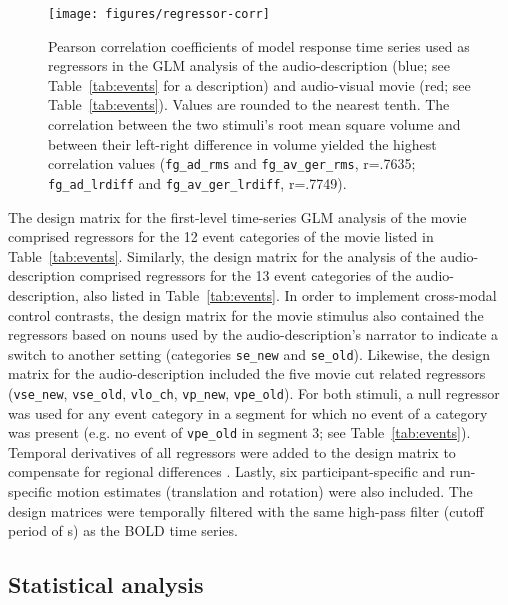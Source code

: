 \documentclass[english,11pt]{article}
\begin{document}
\begin{figure*}[tbp]
\centering
    \texttt{[image: figures/regressor-corr]} \caption{Pearson
        correlation coefficients of model response time series used as regressors in
        the GLM analysis of the
        audio-description (blue; see Table~\ref{tab:events} for a
        description) and audio-visual movie (red; see Table~\ref{tab:events}).
        Values are rounded to the nearest tenth.
        The correlation between the two stimuli's
        root mean square volume and between their left-right difference in
        volume yielded the highest correlation values
        (\texttt{fg\_ad\_rms} and \texttt{fg\_av\_ger\_rms}, r=.7635;
        \texttt{fg\_ad\_lrdiff} and \texttt{fg\_av\_ger\_lrdiff}, r=.7749).
      }
\label{fig:reg-corr}
\end{figure*}


The design matrix for the first-level time-series GLM analysis of the movie
comprised regressors for the 12 event categories of the movie listed in
Table~\ref{tab:events}.
Similarly, the design matrix for the analysis of the audio-description comprised
regressors for the 13 event categories of the audio-description, also listed in
Table~\ref{tab:events}.
In order to implement cross-modal control contrasts, the design matrix for the
movie stimulus also contained the regressors based on nouns used by the
audio-description's narrator to indicate a switch to another setting (categories
\texttt{se\_new} and \texttt{se\_old}).
Likewise, the design matrix for the audio-description included the five movie
cut related regressors (\texttt{vse\_new}, \texttt{vse\_old}, \texttt{vlo\_ch},
\texttt{vp\_new}, \texttt{vpe\_old}).
For both stimuli, a null regressor was used for any event category in a segment
for which no event of a category was present (e.g. no event of \texttt{vpe\_old}
in segment 3; see Table~\ref{tab:events}).
Temporal derivatives of all regressors were added to the design matrix to
compensate for regional differences \citep{friston1998event}.
Lastly, six participant-specific and run-specific motion estimates (translation
and rotation) were also included.
The design matrices were temporally filtered with the same high-pass filter
(cutoff period of \unit[150]{s}) as the BOLD time series.


\subsection*{Statistical analysis}
\end{document}
